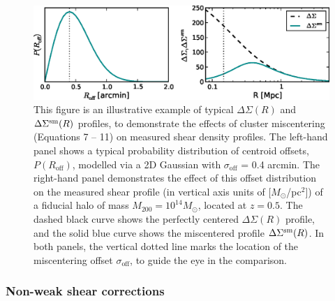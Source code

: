 \begin{figure}
\begin{center}
  \includegraphics[scale=1.0]{plots_ch4/PofRc_DeltaSigma_example.eps}
  \caption[Example of Miscentering Effect on Shear Profile]{This figure is an illustrative example of typical $\Delta\Sigma(R)$ and $\Delta\Sigma^{\rm sm}(R)$ profiles, to demonstrate the effects of cluster miscentering (Equations 7 -- 11) on measured shear density profiles. The left-hand panel shows a typical probability distribution of centroid offsets, $P(R_{\mathrm{off}})$, modelled via a 2D Gaussian with $\sigma_{\mathrm{off}}$ = 0.4 arcmin. The right-hand panel demonstrates the effect of this offset distribution on the measured shear profile (in vertical axis units of [$M_{\odot}$/pc$^2$]) of a fiducial halo of mass $M_{200}=10^{14} M_{\odot}$, located at $z=0.5$. The dashed black curve shows the perfectly centered $\Delta\Sigma(R)$ profile, and the solid blue curve shows the miscentered profile $\Delta\Sigma^{\rm sm}(R)$. In both panels, the vertical dotted line marks the location of the miscentering offset $\sigma_{\mathrm{off}}$, to guide the eye in the comparison.}
\label{plot:miscentering}
\end{center}
\end{figure}


\subsubsection{Non-weak shear corrections}

